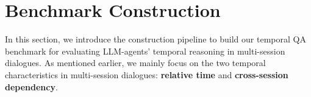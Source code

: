 
\begin{table*}[ht]
\small
\centering
{}
\caption{Statistics of the chosen multi-session dialogue dataset, LoCoMo, compared to others.}
\label{tab:locomo_statistics}
\vspace{-0.3cm}
\end{table*}

\section{Benchmark Construction}
In this section, we introduce the construction pipeline to build our temporal QA benchmark for evaluating LLM-agents' temporal reasoning in multi-session dialogues. As mentioned earlier, we mainly focus on the two temporal characteristics in multi-session dialogues: \textbf{relative time} and \textbf{cross-session dependency}.


